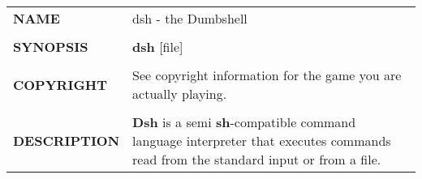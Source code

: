 \begin{tabularx}{\textwidth}{l X}
	\textbf{NAME} & dsh - the Dumbshell
	\\ \\
	\textbf{SYNOPSIS} & \textbf{dsh} [file]
	\\ \\
	\textbf{COPYRIGHT} & See copyright information for the game you are actually playing.
	\\ \\
	\textbf{DESCRIPTION} & \textbf{Dsh} is a semi \textbf{sh}-compatible 	command language interpreter that executes commands read from the standard input or from a file.
\end{tabularx}